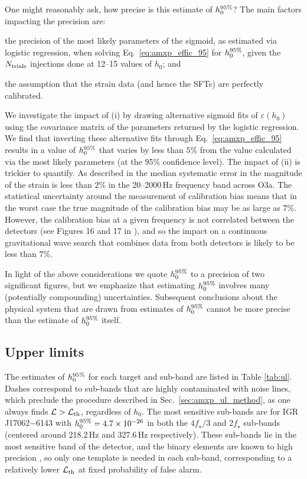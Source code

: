 One might reasonably ask, how precise is this estimate of $h_0^{95\%}$? The main factors impacting the precision are: \begin{enumerate*}
\item the precision of the most likely parameters of the sigmoid, as estimated via logistic regression, when solving Eq.~\eqref{eq:amxp_effic_95} for $h_0^{95\%}$, given the $N_{\rm trials}$ injections done at 12--15 values of $h_0$; and
\item the assumption that the strain data (and hence the SFTs) are perfectly calibrated.
\end{enumerate*}
We investigate the impact of (i) by drawing alternative sigmoid fits of $\varepsilon(h_0)$ using the covariance matrix of the parameters returned by the logistic regression. We find that inverting these alternative fits through Eq.~\eqref{eq:amxp_effic_95} results in a value of $h_0^{95\%}$ that varies by less than $5\%$ from the value calculated via the most likely parameters (at the 95\% confidence level). The impact of (ii) is trickier to quantify. As described in \citet{Sun2020, Sun2021} the median systematic error in the magnitude of the strain is less than $2\%$ in the 20--2000\,Hz frequency band across O3a. The statistical uncertainty around the measurement of calibration bias means that in the worst case the true magnitude of the calibration bias may be as large as $7\%$. However, the calibration bias at a given frequency is not correlated between the detectors (see Figures 16 and 17 in \citet{Sun2020}), and so the impact on a continuous gravitational wave search that combines data from both detectors is likely to be less than $7\%$. 

In light of the above considerations we quote $h_0^{95\%}$ to a precision of two significant figures, but we emphasize that estimating $h_0^{95\%}$ involves many (potentially compounding) uncertainties. Subsequent conclusions about the physical system that are drawn from estimates of $h_0^{95\%}$ cannot be more precise than the estimate of $h_0^{95\%}$ itself.

\subsection{Upper limits \label{sec:amxp_ul_results}}
The estimates of $h_0^{95\%}$ for each target and sub-band are listed in Table \ref{tab:ul}. Dashes correspond to sub-bands that are highly contaminated with noise lines, which preclude the procedure described in Sec.~\ref{sec:amxp_ul_method}, as one always finds $\mathcal{L} > \mathcal{L}_{\rm th}$, regardless of $h_0$. The most sensitive sub-bands are for IGR J17062$-$6143 with $h_0^{95\%} = 4.7 \times 10^{-26}$ in both the $4f_\star/3$ and $2f_\star$ sub-bands (centered around 218.2\,Hz and 327.6\,Hz respectively). These sub-bands lie in the most sensitive band of the detector, and the binary elements are known to high precision \cite{Bult2021}, so only one template is needed in each sub-band, corresponding to a relatively lower $\mathcal{L}_{\rm th}$ at fixed probability of false alarm.

